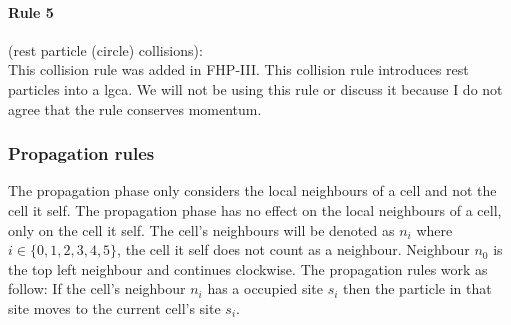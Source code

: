 \documentclass[a4paper,10pt]{article}
\begin{document}
\paragraph{Rule 5}(rest particle (circle) collisions):\\
This collision rule was added in FHP-III.
This collision rule introduces rest particles into
a \acrshort{lgca}. We will not be using this rule or discuss it because I do not agree that the rule conserves momentum.
\subsubsection{Propagation rules}
The propagation phase only considers the local neighbours of a cell and not the cell it self. The propagation phase has no effect on the local neighbours of a cell, only on the cell it self. The cell's neighbours will be denoted as $n_i$ where $i \in \{0, 1, 2, 3, 4, 5\}$, the cell it self does not count as a neighbour. Neighbour $n_0$ is the top left neighbour and continues clockwise. The propagation rules work as follow: If the cell's neighbour $n_i$ has a occupied site $s_{i}$ then the particle in that site moves to the current cell's
site $s_{i}$.
\end{document}
